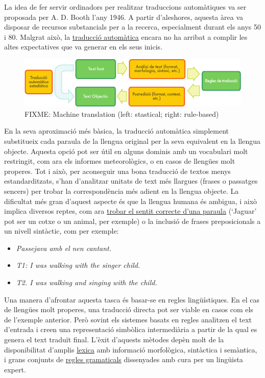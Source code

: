 \documentclass[]{../../metanetpaper}
\begin{document}
\begin{multicols}{2}
La idea de fer servir ordinadors per realitzar traduccions automàtiques va ser proposada per A. D. Booth l’any 1946. A partir d’aleshores, aquesta àrea va disposar de recursos substancials per a la recerca, especialment durant els anys 50 i 80. Malgrat això, la \underline{traducció automàtica} encara no ha arribat a complir les altes expectatives que va generar en els seus inicis.  

\begin{figure}[htb]
  \vspace{-21mm}
  \center
  \includegraphics[width=\textwidth]{../_media/catalan/machine_translation}
  \vspace{-2mm}
  \caption{FIXME: Machine translation (left: stastical; right: rule-based)}
  \label{fig:mtarch_ca}
\end{figure}

En la seva aproximació més bàsica, la traducció automàtica simplement substitueix cada paraula de la llengua original per la seva equivalent en la llengua objecte. Aquesta opció pot ser útil en alguns dominis amb un vocabulari molt restringit, com ara els informes meteorològics, o en casos de llengües molt properes. Tot i això, per aconseguir una bona traducció de textos menys estandarditzats, s’han d’analitzar unitats de text més llargues (frases o passatges sencers) per trobar la correspondència més adient en la llengua objecte. La dificultat més gran d’aquest aspecte és que la llengua humana és ambigua, i això implica diversos reptes, com ara \underline{trobar el sentit correcte d’una paraula} (‘Jaguar’ pot ser un cotxe o un animal, per exemple) o la inclusió de frases preposicionals a un nivell sintàctic, com per exemple:
\begin{itemize}
\item \textit{Passejava amb el nen cantant.}
\item \textit{T1: I was walking with the singer child.}
\item \textit{T2. I was walking and singing with the child.}
\end{itemize}

Una manera d’afrontar aquesta tasca és basar-se en regles lingüístiques. En el cas de llengües molt properes, una traducció directa pot ser viable en casos com els de l’exemple anterior. Però sovint els sistemes basats en regles analitzen el text d’entrada i creen una representació simbòlica intermediària a partir de la qual es genera el text traduït final. L’èxit d’aquests mètodes depèn molt de la disponibilitat d’amplis \underline{lexica} amb informació morfològica, sintàctica i semàntica, i grans conjunts de \underline{regles gramaticals} dissenyades amb cura per un lingüista expert.


\end{multicols}
\end{document}
